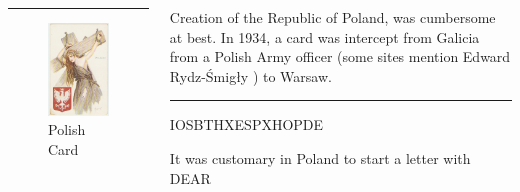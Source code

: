 \documentclass{beamer}
\theoremstyle{definition}
\theoremstyle{remark}
\begin{document}
\begin{frame}
	\begin{columns}[T] %
		\begin{column}{.48\textwidth}
			\color{red}\rule{\linewidth}{4pt}
			\begin{figure}
				\includegraphics[scale=0.25]{PolishPostcard}
				\caption{Polish Card}
			\end{figure}
		\end{column}%
		\hfill%
		\begin{column}{.48\textwidth}
			Creation of the Republic of Poland, was cumbersome at best. In 1934, a card was intercept from Galicia from a Polish Army officer (some sites mention Edward Rydz-Śmigły ) to Warsaw.
			\color{blue}\rule{\linewidth}{4pt}
			\centering IOSBTHXESPXHOPDE
			
			It was customary in Poland to start a letter with DEAR
		\end{column}%
	\end{columns}
\end{frame}
\end{document}
